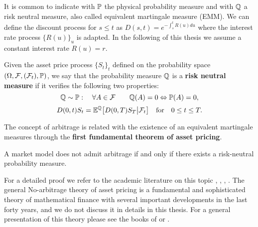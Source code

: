 It is common to indicate with $\mathbb{P}$ the physical probability measure and with $\mathbb{Q}$ a risk neutral measure, also called equivalent martingale measure (EMM).
We can define the discount process for $s \leq t$ as
$D(s,t) = e^{-\int_s^t R(u) du}$ where the interest rate process $\{R(u)\}_u$ is adapted. In the following of this thesis we assume a constant interest rate $R(u) = r$.
\begin{Definition}
 Given the asset price process $\{S_t\}_t$ defined on the probability space 
 $(\Omega,\mathcal{F},(\mathcal{F}_{t}),\mathbb{P})$, we say that the probability measure $\mathbb{Q}$ is a \textbf{risk neutral measure}
 if it verifies the following two properties:
 \begin{equation}
 \mathbb{Q} \sim \mathbb{P} : \quad \forall A \in \mathcal{F} \quad \quad \mathbb{Q}(A) = 0 \Leftrightarrow \mathbb{P}(A) = 0,  
 \end{equation}
\begin{equation}
 D(0,t) S_t = \mathbb{E}^{\mathbb{Q}} \bigl[ D(0,T) S_T \big| \mathcal{F}_t \bigr] \quad \mbox{for} \quad 0\leq t \leq T.
\end{equation}
\end{Definition}
The concept of arbitrage is related with the existence of an equivalent martingale measures through the \textbf{first fundamental theorem of asset pricing}.
\begin{Theorem}
 A market model does not admit arbitrage if and only if there exists a risk-neutral probability measure. 
\end{Theorem}
For a detailed proof we refer to the academic literature on this topic \cite{HaKr79}, \cite{HaPl81}, \cite{DelSch98}, \cite{Sch02}.
The general No-arbitrage theory of asset pricing is a fundamental and sophisticated theory of mathematical finance with several important developments 
in the last forty years, and we do not discuss it in details in this thesis.
For a general presentation of this theory please see the books of \cite{Musiela} or \cite{Shreve}.

